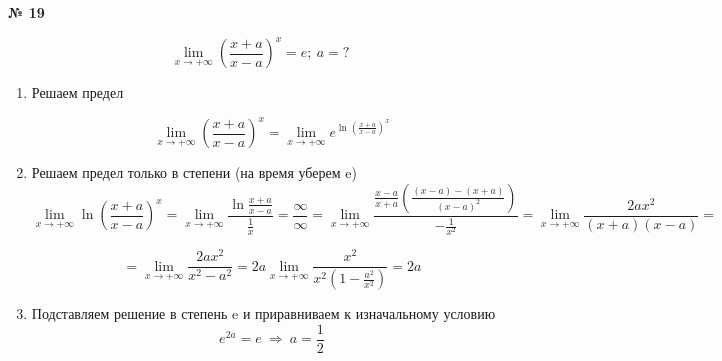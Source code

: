 \documentclass{article}
\begin{document}
\textbf{№ 19} 
\large

$$ \lim\limits_{x \to +\infty} \left( \frac{x+a}{x-a} \right)^x = e; \ a = ? $$  

\begin{enumerate}
\item Решаем предел

$$ \lim\limits_{x \to +\infty} \left( \frac{x+a}{x-a} \right)^x
= \lim\limits_{x \to +\infty} e^{\ln{\left( \frac{x+a}{x-a} \right)^x}} $$

\item Решаем предел только в степени (на время уберем e)
$$ \lim\limits_{x \to +\infty} \ln{\left( \frac{x+a}{x-a} \right)^x} 
= \lim\limits_{x \to +\infty} \frac{\ln{\frac{x+a}{x-a}}}{\frac{1}{x}}  
= \frac{\infty}{\infty}
= \lim\limits_{x \to +\infty} \frac{ \frac{x-a}{x+a} \left( \frac{(x-a)-(x+a)}{(x-a)^2} \right) }{-\frac{1}{x^2}} 
= \lim\limits_{x \to +\infty} \frac{2ax^2}{(x+a)(x-a)} 
= $$

$$ = \lim\limits_{x \to +\infty} \frac{2ax^2}{x^2-a^2}  
= 2a \lim\limits_{x \to +\infty} \frac{x^2}{x^2 \left(1 - \frac{a^2}{x^2} \right)} 
= 2a $$

\item Подставляем решение в степень e и приравниваем к изначальному условию
$$ e^{2a} = e \ \Rightarrow \ a = \frac{1}{2} $$

\end{enumerate}
\end{document}
